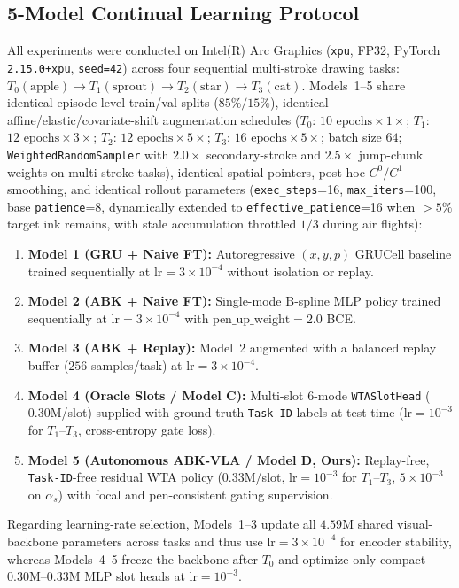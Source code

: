 \documentclass[10pt,twocolumn]{article}
\begin{document}
\subsection{5-Model Continual Learning Protocol}
All experiments were conducted on Intel(R) Arc Graphics (\texttt{xpu}, FP32, PyTorch \texttt{2.15.0+xpu}, \texttt{seed=42}) across four sequential multi-stroke drawing tasks: $T_0(\text{apple}) \rightarrow T_1(\text{sprout}) \rightarrow T_2(\text{star}) \rightarrow T_3(\text{cat})$. Models~1--5 share identical episode-level train/val splits ($85\% / 15\%$), identical affine/elastic/covariate-shift augmentation schedules ($T_0$: $10\text{ epochs} \times 1\times$; $T_1$: $12\text{ epochs} \times 3\times$; $T_2$: $12\text{ epochs} \times 5\times$; $T_3$: $16\text{ epochs} \times 5\times$; batch size $64$; \texttt{WeightedRandomSampler} with $2.0\times$ secondary-stroke and $2.5\times$ jump-chunk weights on multi-stroke tasks), identical spatial pointers, post-hoc $C^0/C^1$ smoothing, and identical rollout parameters (\texttt{exec\_steps}=16, \texttt{max\_iters}=100, base \texttt{patience}=8, dynamically extended to \texttt{effective\_patience}=16 when $>5\%$ target ink remains, with stale accumulation throttled $1/3$ during air flights):
\begin{enumerate}
    \item \textbf{Model 1 (GRU + Naive FT):} Autoregressive $(x, y, p)$ GRUCell baseline trained sequentially at $\text{lr}=3\times 10^{-4}$ without isolation or replay.
    \item \textbf{Model 2 (ABK + Naive FT):} Single-mode B-spline MLP policy trained sequentially at $\text{lr}=3\times 10^{-4}$ with $\text{pen\_up\_weight}=2.0$ BCE.
    \item \textbf{Model 3 (ABK + Replay):} Model~2 augmented with a balanced replay buffer ($256$ samples/task) at $\text{lr}=3\times 10^{-4}$.
    \item \textbf{Model 4 (Oracle Slots / Model C):} Multi-slot 6-mode \texttt{WTASlotHead} ($0.30\text{M}$/slot) supplied with ground-truth \texttt{Task-ID} labels at test time ($\text{lr}=10^{-3}$ for $T_1$--$T_3$, cross-entropy gate loss).
    \item \textbf{Model 5 (Autonomous ABK-VLA / Model D, Ours):} Replay-free, \texttt{Task-ID}-free residual WTA policy ($0.33\text{M}$/slot, $\text{lr}=10^{-3}$ for $T_1$--$T_3$, $5\times 10^{-3}$ on $\alpha_s$) with focal and pen-consistent gating supervision.
\end{enumerate}
Regarding learning-rate selection, Models~1--3 update all $4.59\text{M}$ shared visual-backbone parameters across tasks and thus use $\text{lr}=3\times 10^{-4}$ for encoder stability, whereas Models~4--5 freeze the backbone after $T_0$ and optimize only compact $0.30\text{M}$--$0.33\text{M}$ MLP slot heads at $\text{lr}=10^{-3}$.
\end{document}
